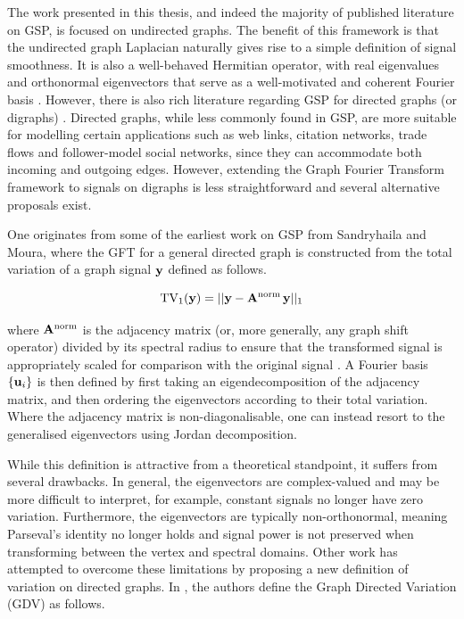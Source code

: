 The work presented in this thesis, and indeed the majority of published literature on GSP, is focused on undirected graphs. The benefit of this framework is that the undirected graph Laplacian naturally gives rise to a simple definition of signal smoothness. It is also a well-behaved Hermitian operator, with real eigenvalues and orthonormal eigenvectors that serve as a well-motivated and coherent Fourier basis \citep{Ortega2018}. However, there is also rich literature regarding GSP for directed graphs (or digraphs) \citep{Marques2020}. Directed graphs, while less commonly found in GSP, are more suitable for modelling certain applications such as web links, citation networks, trade flows and follower-model social networks, since they can accommodate both incoming and outgoing edges. However, extending the Graph Fourier Transform framework to signals on digraphs is less straightforward and several alternative proposals exist. 

One originates from some of the earliest work on GSP from Sandryhaila and Moura, where the GFT for a general directed graph is constructed from the total variation of a graph signal $\mathbf{y}$ defined as follows. 

\begin{equation}
    \text{TV}_1(\mathbf{y}) = || \mathbf{y} - \mathbf{A}^{\text{norm}} \, \mathbf{y} ||_1
\end{equation}

where $\mathbf{A}^{\text{norm}}$ is the adjacency matrix (or, more generally, any graph shift operator) divided by its spectral radius to ensure that the transformed signal is appropriately scaled for comparison with the original signal \citep{Sandryhaila2013b}. A Fourier basis $\{\mathbf{u}_i \}$ is then defined by first taking an eigendecomposition of the adjacency matrix, and then ordering the eigenvectors according to their total variation. Where the adjacency matrix is non-diagonalisable, one can instead resort to the generalised eigenvectors using Jordan decomposition. 

While this definition is attractive from a theoretical standpoint, it suffers from several drawbacks. In general, the eigenvectors are complex-valued and may be more difficult to interpret, for example, constant signals no longer have zero variation. Furthermore, the eigenvectors are typically non-orthonormal, meaning Parseval's identity no longer holds and signal power is not preserved when transforming between the vertex and spectral domains. Other work has attempted to overcome these limitations by proposing a new definition of variation on directed graphs. In \cite{Sardellitti2017}, the authors define the Graph Directed Variation (GDV) as follows. 

